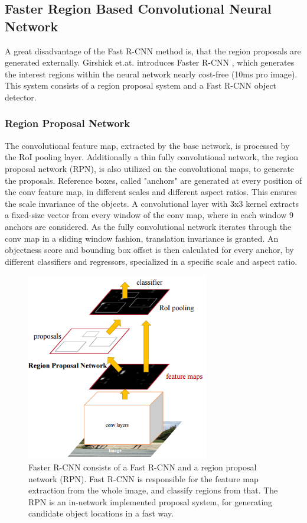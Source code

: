 \subsection{Faster Region Based Convolutional Neural Network}\label{s:c-fasterrcnn}

A great disadvantage of the Fast R-CNN method is, that the region proposals are generated externally. Girshick et.at. introduces Faster R-CNN \cite{NIPS2015_5638}, which generates the interest regions within the neural network nearly cost-free (10ms pro image). This system consists of a region proposal system and a Fast R-CNN object detector.

\subsubsection{Region Proposal Network}

The convolutional feature map, extracted by the base network, is processed by the RoI pooling layer. Additionally a thin fully convolutional network, the region proposal network (RPN), is also utilized on the convolutional maps, to generate the proposals. Reference boxes, called "anchors" are generated at every position of the conv feature map, in different scales and different aspect ratios. This ensures the scale invariance of the objects. A convolutional layer with 3x3 kernel extracts a fixed-size vector from every window of the conv map, where in each window 9 anchors are considered. As the fully convolutional network iterates through the conv map in a sliding window fashion, translation invariance is granted. An objectness score and bounding box offset is then calculated for every anchor, by different classifiers and regressors, specialized in a specific scale and aspect ratio.
\begin{figure}[h!]
	\centering
	\includegraphics[width=8cm]{images/mt/faster-rcnn.png}
	\caption{Faster R-CNN consists of a Fast R-CNN and a region proposal network (RPN). Fast R-CNN is responsible for the feature map extraction from the whole image, and classify regions from that. The RPN is an in-network implemented proposal system, for generating candidate object locations in a fast way.}
	\label{fig:faster-rcnn}
\end{figure}
